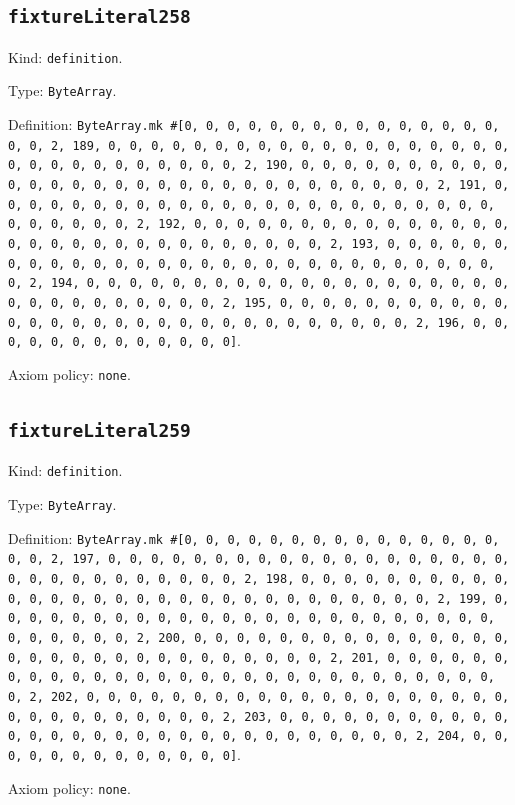 \documentclass[11pt]{article}
\begin{document}
\subsection*{\texttt{fixtureLiteral258}}
\noindent Kind: \texttt{definition}.\par
\noindent Type: \texttt{ByteArray}.\par
\noindent Definition: \texttt{ByteArray.mk \#[0, 0, 0, 0, 0, 0, 0, 0, 0, 0, 0, 0, 0, 0, 0, 0, 0, 2, 189, 0, 0, 0, 0, 0, 0, 0, 0, 0, 0, 0, 0, 0, 0, 0, 0, 0, 0, 0, 0, 0, 0, 0, 0, 0, 0, 0, 0, 0, 0, 2, 190, 0, 0, 0, 0, 0, 0, 0, 0, 0, 0, 0, 0, 0, 0, 0, 0, 0, 0, 0, 0, 0, 0, 0, 0, 0, 0, 0, 0, 0, 0, 2, 191, 0, 0, 0, 0, 0, 0, 0, 0, 0, 0, 0, 0, 0, 0, 0, 0, 0, 0, 0, 0, 0, 0, 0, 0, 0, 0, 0, 0, 0, 0, 2, 192, 0, 0, 0, 0, 0, 0, 0, 0, 0, 0, 0, 0, 0, 0, 0, 0, 0, 0, 0, 0, 0, 0, 0, 0, 0, 0, 0, 0, 0, 0, 2, 193, 0, 0, 0, 0, 0, 0, 0, 0, 0, 0, 0, 0, 0, 0, 0, 0, 0, 0, 0, 0, 0, 0, 0, 0, 0, 0, 0, 0, 0, 0, 2, 194, 0, 0, 0, 0, 0, 0, 0, 0, 0, 0, 0, 0, 0, 0, 0, 0, 0, 0, 0, 0, 0, 0, 0, 0, 0, 0, 0, 0, 0, 0, 2, 195, 0, 0, 0, 0, 0, 0, 0, 0, 0, 0, 0, 0, 0, 0, 0, 0, 0, 0, 0, 0, 0, 0, 0, 0, 0, 0, 0, 0, 0, 0, 2, 196, 0, 0, 0, 0, 0, 0, 0, 0, 0, 0, 0, 0, 0]}.\par
\noindent Axiom policy: \texttt{none}.\par
\subsection*{\texttt{fixtureLiteral259}}
\noindent Kind: \texttt{definition}.\par
\noindent Type: \texttt{ByteArray}.\par
\noindent Definition: \texttt{ByteArray.mk \#[0, 0, 0, 0, 0, 0, 0, 0, 0, 0, 0, 0, 0, 0, 0, 0, 0, 2, 197, 0, 0, 0, 0, 0, 0, 0, 0, 0, 0, 0, 0, 0, 0, 0, 0, 0, 0, 0, 0, 0, 0, 0, 0, 0, 0, 0, 0, 0, 0, 2, 198, 0, 0, 0, 0, 0, 0, 0, 0, 0, 0, 0, 0, 0, 0, 0, 0, 0, 0, 0, 0, 0, 0, 0, 0, 0, 0, 0, 0, 0, 0, 2, 199, 0, 0, 0, 0, 0, 0, 0, 0, 0, 0, 0, 0, 0, 0, 0, 0, 0, 0, 0, 0, 0, 0, 0, 0, 0, 0, 0, 0, 0, 0, 2, 200, 0, 0, 0, 0, 0, 0, 0, 0, 0, 0, 0, 0, 0, 0, 0, 0, 0, 0, 0, 0, 0, 0, 0, 0, 0, 0, 0, 0, 0, 0, 2, 201, 0, 0, 0, 0, 0, 0, 0, 0, 0, 0, 0, 0, 0, 0, 0, 0, 0, 0, 0, 0, 0, 0, 0, 0, 0, 0, 0, 0, 0, 0, 2, 202, 0, 0, 0, 0, 0, 0, 0, 0, 0, 0, 0, 0, 0, 0, 0, 0, 0, 0, 0, 0, 0, 0, 0, 0, 0, 0, 0, 0, 0, 0, 2, 203, 0, 0, 0, 0, 0, 0, 0, 0, 0, 0, 0, 0, 0, 0, 0, 0, 0, 0, 0, 0, 0, 0, 0, 0, 0, 0, 0, 0, 0, 0, 2, 204, 0, 0, 0, 0, 0, 0, 0, 0, 0, 0, 0, 0, 0]}.\par
\noindent Axiom policy: \texttt{none}.\par
\end{document}
